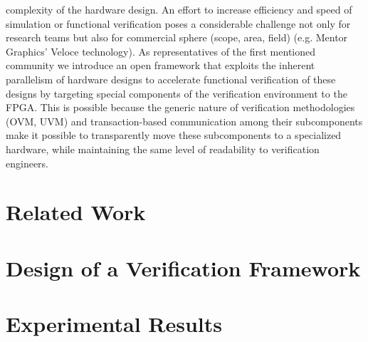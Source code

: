 \documentclass[draft]{llncs}
\begin{document}
complexity of the hardware design. An effort to increase efficiency and speed of 
simulation or functional verification poses a considerable challenge not only for 
research teams but also for commercial sphere (scope, area, field) (e.g. Mentor 
Graphics' Veloce technology). As representatives of the first mentioned community 
we introduce an open framework that exploits the inherent parallelism of hardware 
designs to accelerate functional verification of these designs by targeting 
special components of the verification environment to the FPGA. This is possible 
because the generic nature of verification methodologies (OVM, UVM) and 
transaction-based communication among their subcomponents make it possible to 
transparently move these subcomponents to a specialized hardware, while 
maintaining the same level of readability to verification engineers.
\vspace*{-0mm}\section{Related Work}\vspace*{-0mm}


\vspace*{-0mm}\section{Design of a Verification Framework}\vspace*{-0mm}


\vspace*{-0mm}\section{Experimental Results}\vspace*{-0mm}
\end{document}

